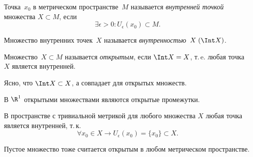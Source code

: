 
\begin{definition}
Точка~\(x_0\) в метрическом пространстве~\(M\) называется \textit{внутренней точкой} множества \(X
\subset M\), если
\[
    \exists \epsilon > 0 \colon U_\epsilon(x_0) \subset M.
\]
\end{definition}

\begin{definition}
Множество внутренних точек~\(X\) называется \textit{внутренностью}~\(X \; (\Int X)\).
\end{definition}

\begin{definition}
Множество~\(X \subset M\) называется \textit{открытым}, если \(\Int X = X\), т.\,e. любая точка
\(X\) является внутренней.
\end{definition}

Ясно, что \(\Int X \subset X\), а совпадает для открытых множеств.

\begin{examples}
В \(\R^1\) открытыми множествами являются открытые промежутки.

В пространстве с тривиальной метрикой для любого множества \(X\) любая точка является внутренней,
т.\,к.
\[
    \forall x_0 \in X \rightarrow U_\epsilon (x_0) = \{x_0\} \subset X.
\]
\end{examples}

\begin{note}
Пустое множество тоже считается открытым в любом метрическом пространстве.
\end{note}